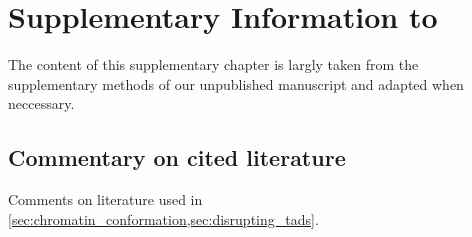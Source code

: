 \chapter{Supplementary Information to \texorpdfstring{}{the Balancer Project}}
\label{sec:suppl_balancer}


The content of this supplementary chapter is largly taken from the supplementary
methods of our unpublished manuscript and adapted when neccessary.


\section{Commentary on cited literature}
\label{sec:suppl_balancer_literature}

Comments on literature used in \cref{sec:chromatin_conformation,sec:disrupting_tads}.

